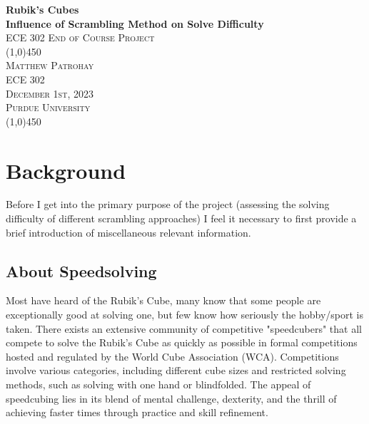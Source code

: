 \documentclass[12pt,letterpaper]{article}
\numberwithin{equation}{section}
\begin{document}
\begin{titlepage}

	\begin{center}
	\begin{spacing}{1.0}

		\vspace*{0.6in}
		\huge{\bfseries Rubik's Cubes}\\
			[2mm]
		\huge{\bfseries Influence of Scrambling Method on Solve Difficulty}\\
			[10mm]
		\textsc{\large ECE 302 End of Course Project}\\
			[2.0in]
	
		\line(1,0){450}\\
			[0.5in]
		\textsc{\large Matthew Patrohay}\\
		\textsc{\large ECE 302}\\
		\textsc{\large December 1st, 2023}\\
			[0.5in]
		\textsc{\large Purdue University}\\
			[0.5in]

			
		\line(1,0){450}\\
	\end{spacing}
	\end{center}
	
\end{titlepage}
\newpage
\tableofcontents


\newpage

\section{Background}

Before I get into the primary purpose of the project (assessing the solving difficulty of different scrambling approaches) I feel it necessary to first provide a brief introduction of miscellaneous relevant information. 

\subsection{About Speedsolving}

Most have heard of the Rubik's Cube, many know that some people are exceptionally good at solving one, but few know how seriously the hobby/sport is taken. There exists an extensive community of competitive "speedcubers" that all compete to solve the Rubik's Cube as quickly as possible in formal competitions hosted and regulated by the World Cube Association (WCA). Competitions involve various categories, including different cube sizes and restricted solving methods, such as solving with one hand or blindfolded. The appeal of speedcubing lies in its blend of mental challenge, dexterity, and the thrill of achieving faster times through practice and skill refinement.
\end{document}
